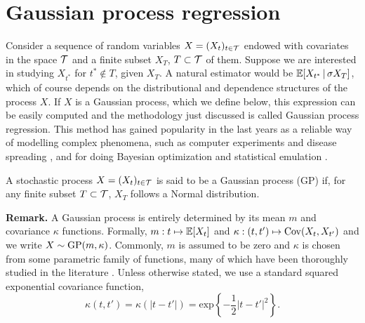 

\section{Gaussian process regression} \label{section:GPs}


Consider a sequence of random variables $X = (X_t)_{t \in \mathcal{T}}$ endowed with covariates in the space $\mathcal{T}$ and a finite subset $X_T$, $T \subset \mathcal{T}$ of them. Suppose we are interested in studying $X_{t^{*}}$ for $t^{*} \notin T$, given $X_T$. A natural estimator would be $\mathbb{E} [X_{t^{*}} \, | \, \sigma X_T ]$, which of course depends on the distributional and dependence structures of the process $X$. If $X$ is a Gaussian process, which we define below, this expression can be easily computed and the methodology just discussed is called Gaussian process regression. This method has gained popularity in the last years as a reliable way of modelling complex phenomena, such as computer experiments \cite{SacksEtAl:1989:CompExp} and disease spreading \cite{PokharelDeardon:2016:GPInfectDisease}, and for doing Bayesian optimization \cite{Frazier:2018:BayesOptTutorial} and statistical emulation \cite{WoodsEtAl:2017:ACEAlgorithm}.



\begin{definition} \label{def:GP}
	A stochastic process $X = (X_t)_{t \in \mathcal{T}}$ is said to be a Gaussian process (GP) if, for any finite subset $T \subset \mathcal{T}$, $X_T$ follows a Normal distribution. 
\end{definition}


\textbf{Remark.} A Gaussian process is entirely determined by its mean $m$ and covariance $\kappa$ functions. Formally, $m: t \mapsto \mathbb{E}[X_t]$ and $\kappa: (t, t') \mapsto \mathrm{Cov}(X_t, X_{t'})$ and we write $X \sim \mathrm{GP} (m, \kappa)$. Commonly, $m$ is assumed to be zero and $\kappa$ is chosen from some parametric family of functions, many of which have been thoroughly studied in the literature \cite[see][Ch.~4]{RasmussenWilliams:2006}. Unless otherwise stated, we use a standard squared exponential covariance function,
\begin{equation} \label{eq:sq_exp_cov}
	\kappa(t, t') = \kappa(|t-t'|) = \mathrm{exp} \left\{ -\frac{1}{2} |t-t'|^2 \right\}.
\end{equation}




